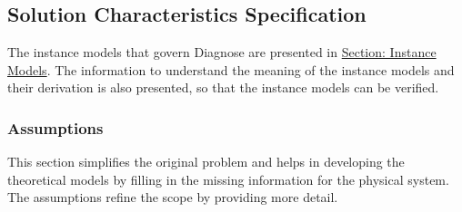 \documentclass[12pt]{article}
\begin{document}
\subsection{Solution Characteristics Specification}
\label{Sec:SolCharSpec}
The instance models that govern Diagnose are presented in \hyperref[Sec:IMs]{Section: Instance Models}. The information to understand the meaning of the instance models and their derivation is also presented, so that the instance models can be verified.

\subsubsection{Assumptions}
\label{Sec:Assumps}
This section simplifies the original problem and helps in developing the theoretical models by filling in the missing information for the physical system. The assumptions refine the scope by providing more detail.
\end{document}
